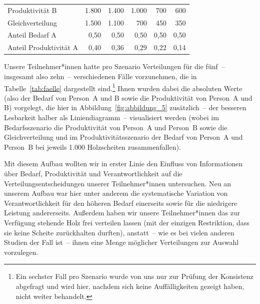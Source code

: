 \documentclass[justified,nobib,symmetric,twoside]{tufte-handout}
\begin{document}
\begin{table}[t]
\begin{center}
\begin{tabular}{lrrrrr}
   Produktivität B        & 1.800                 & 1.400                 & 1.000                 & 700                   & 600                   \\
   Gleichverteilung       & 1.500                 & 1.100                 & 700                   & 450                   & 350                   \\
   Anteil Bedarf A        & 0,50                  & 0,50                  & 0,50                  & 0,50                  & 0,50                  \\
   Anteil Produktivität A & 0,40                  & 0,36                  & 0,29                  & 0,22                  & 0,14                  \\
   \hline
   \end{tabular}
   \end{center}
\end{table}	

Unsere Teilnehmer*innen hatte pro Szenario Verteilungen für die fünf~-- insgesamt also zehn~-- verschiedenen Fälle vorzunehmen, die in Tabelle~\ref{tab:faelle} dargestellt sind.\footnote{Ein sechster Fall pro Szenario wurde von uns nur zur Prüfung der Konsistenz abgefragt und wird hier, nachdem sich keine Auffälligkeiten gezeigt haben, nicht weiter behandelt.}
Ihnen wurden dabei die absoluten Werte (also der Bedarf von Person~A und B sowie die Produktivität von Person~A und B) vorgelegt, die hier in Abbildung~\ref{fig:abbildung_5} zusätzlich~-- der besseren Lesbarkeit halber als Liniendiagramm~-- visualisiert werden (wobei im Bedarfsszenario die Produktivität von Person~A und Person~B sowie die Gleichverteilung und im Produktivitätsszenario der Bedarf von Person~A und Person~B bei jeweils 1.000 Holzscheiten zusammenfallen).

Mit diesem Aufbau wollten wir in erster Linie den Einfluss von Informationen über Bedarf, Produktivität und Verantwortlichkeit auf die Verteilungsentscheidungen unserer Teilnehmer*innen untersuchen.
Neu an unserem Aufbau war hier unter anderem die systematische Variation von Verantwortlichkeit für den höheren Bedarf einerseits sowie für die niedrigere Leistung andererseits.
Außerdem haben wir unsere Teilnehmer*innen das zur Verfügung stehende Holz frei verteilen lassen (mit der einzigen Restriktion, dass sie keine Scheite zurückhalten durften), anstatt~-- wie es bei vielen anderen Studien der Fall ist~-- ihnen eine Menge möglicher Verteilungen zur Auswahl vorzulegen.
\end{document}
